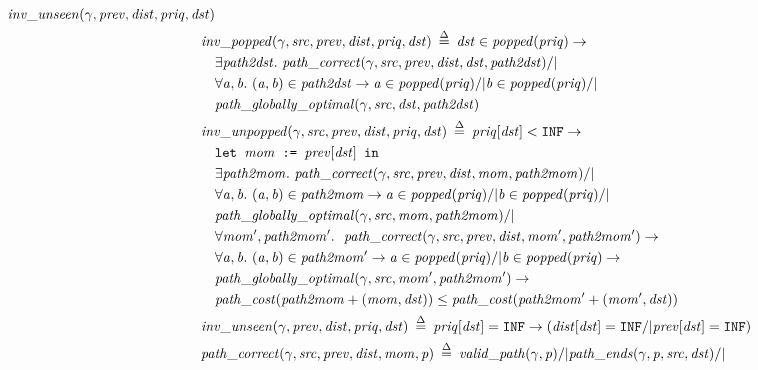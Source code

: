 \begin{figure}
\begin{equation*}
\begin{split}
\m{inv\_unseen}(\gamma, \m{prev}, \m{dist}, \m{priq}, \m{dst}) \\
\vspace{1em}
&\!\!\!\!\!\!\m{inv\_popped}(\gamma, \m{src}, \m{prev}, \m{dist}, \m{priq}, \m{dst}) \; \defeq \; \m{dst} \in \m{popped}(\m{priq}) -> \\
&\exists \m{path2dst}.~\m{path\_correct}(\gamma, \m{src}, \m{prev}, \m{dist}, \m{dst}, \m{path2dst}) /| \null \\
&\forall \m{a, b}.~\m{(a, b)} \in \m{path2dst} -> \m{a} \in \m{popped}(\m{priq}) /| \m{b} \in \m{popped}(\m{priq}) /| \null \\
&\m{path\_globally\_optimal}(\gamma, \m{src}, \m{dst}, \m{path2dst}) \\
\vspace{1em}
&\!\!\!\!\!\!\m{inv\_unpopped}(\gamma, \m{src}, \m{prev}, \m{dist}, \m{priq}, \m{dst}) \; \defeq \; \m{priq}[\m{dst}] < \texttt{INF} -> \\
&\texttt{let } \m{mom} \texttt{ := } \m{prev}[\m{dst}] \texttt{ in } \\
&\exists \m{path2mom}.~\m{path\_correct}(\gamma, \m{src}, \m{prev}, \m{dist}, \m{mom}, \m{path2mom}) /| \null \\
&\forall \m{a, b}.~\m{(a, b)} \in \m{path2mom} -> \m{a} \in \m{popped}(\m{priq}) /| \m{b} \in \m{popped}(\m{priq}) /| \null \\
&\m{path\_globally\_optimal}(\gamma, \m{src}, \m{mom}, \m{path2mom}) /| \null \\
&\forall \m{mom', path2mom'}.~~\m{path\_correct}(\gamma, \m{src}, \m{prev}, \m{dist}, \m{mom'}, \m{path2mom'}) -> \\
&\forall \m{a, b}.~\m{(a, b)} \in \m{path2mom'} -> \m{a} \in \m{popped}(\m{priq}) /| \m{b} \in \m{popped}(\m{priq}) -> \\
&\m{path\_globally\_optimal}(\gamma, \m{src}, \m{mom'}, \m{path2mom'}) -> \\
&\m{path\_cost}(\m{path2mom} + \m{(mom, dst)}) \le \m{path\_cost}(\m{path2mom'} + \m{(mom', dst)}) \\
\vspace{1em}
&\!\!\!\!\!\!\m{inv\_unseen}(\gamma, \m{prev}, \m{dist}, \m{priq}, \m{dst}) \; \defeq \; \m{priq}[\m{dst}] = \texttt{INF} ->
(\m{dist}[\m{dst}] = \texttt{INF} /| \m{prev}[\m{dst}] = \texttt{INF}) \\
\vspace{1em}
&\!\!\!\!\!\!\m{path\_correct}(\gamma, \m{src}, \m{prev}, \m{dist}, \m{mom}, \m{p}) \; \defeq \; 
\m{valid\_path}(\gamma, \m{p}) /| \m{path\_ends}(\gamma, \m{p}, \m{src}, \m{dst}) /| \null \\

\end{split}
\end{equation*}
\end{figure}
